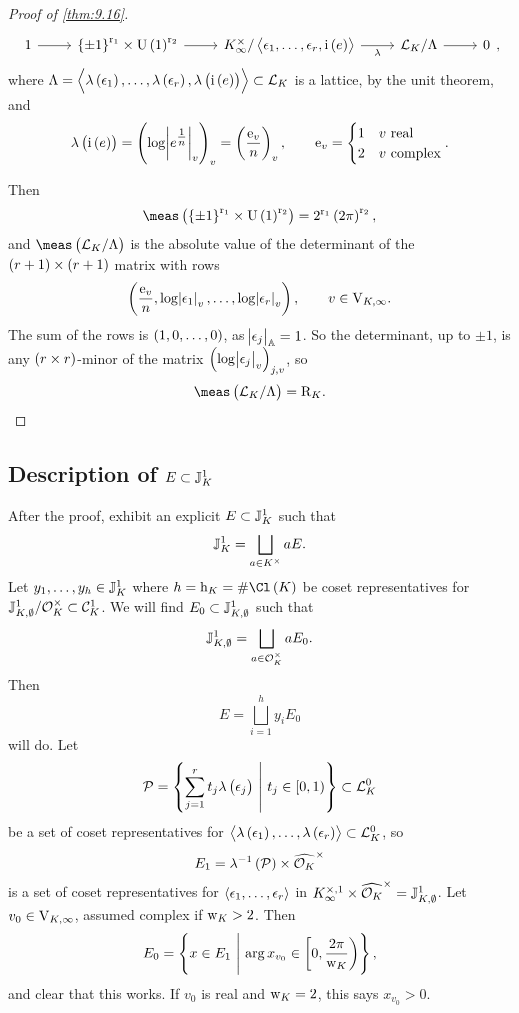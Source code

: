 \begin{proof}[Proof of \ref{thm:9.16}]
$$\begin{tikzcd}
1 \arrow{r} & \cbr{\pm 1}^{\r_1} \times \U\br{1}^{\r_2} \arrow{r} & K_\infty^\times / \abr{\epsilon_1, \dots, \epsilon_r, \i\br{e}} \arrow{r}[swap]{\lambda} & \LLL_K / \Lambda \arrow{r} & 0
\end{tikzcd},
$$
where $ \Lambda = \abr{\lambda\br{\epsilon_1}, \dots, \lambda\br{\epsilon_r}, \lambda\br{\i\br{e}}} \subset \LLL_K $ is a lattice, by the unit theorem, and
$$ \lambda\br{\i\br{e}} = \br{\log \abs{e^{\tfrac{1}{n}}}_v}_v = \br{\dfrac{\e_v}{n}}_v, \qquad \e_v =
\begin{cases}
1 & v \ \text{real} \\
2 & v \ \text{complex}
\end{cases}.
$$

\pagebreak

Then
$$ \meas\br{\cbr{\pm 1}^{\r_1} \times \U\br{1}^{\r_2}} = 2^{\r_1}\br{2\pi}^{\r_2}, $$
and $ \meas\br{\LLL_K / \Lambda} $ is the absolute value of the determinant of the $ \br{r + 1} \times \br{r + 1} $ matrix with rows
$$ \br{\dfrac{\e_v}{n}, \log \abs{\epsilon_1}_v, \dots, \log \abs{\epsilon_r}_v}, \qquad v \in \V_{K, \infty}. $$
The sum of the rows is $ \br{1, 0, \dots, 0} $, as $ \abs{\epsilon_j}_{\mathbb{A}} = 1 $. So the determinant, up to $ \pm 1 $, is any $ \br{r \times r} $-minor of the matrix $ \br{\log \abs{\epsilon_j}_v}_{j, v} $, so
$$ \meas\br{\LLL_K / \Lambda} = \R_K. $$
\end{proof}

\subsection{Description of \texorpdfstring{$ E \subset \mathbb{J}_K^1 $}{the fundamental domain}}

After the proof, exhibit an explicit $ E \subset \mathbb{J}_K^1 $ such that
$$ \mathbb{J}_K^1 = \bigsqcup_{a \in K^\times} aE. $$
Let $ y_1, \dots, y_h \in \mathbb{J}_K^1 $ where $ h = \h_K = \#\Cl\br{K} $ be coset representatives for $ \mathbb{J}_{K, \emptyset}^1 / \mathcal{O}_K^\times \subset \mathcal{C}_K^1 $. We will find $ E_0 \subset \mathbb{J}_{K, \emptyset}^1 $ such that
$$ \mathbb{J}_{K, \emptyset}^1 = \bigsqcup_{a \in \mathcal{O}_K^\times} aE_0. $$
Then
$$ E = \bigsqcup_{i = 1}^h y_iE_0 $$
will do. Let
$$ \PPP = \cbr{\sum_{j = 1}^r t_j\lambda\br{\epsilon_j} \st t_j \in \intco{0, 1}} \subset \LLL_K^0 $$
be a set of coset representatives for $ \abr{\lambda\br{\epsilon_1}, \dots, \lambda\br{\epsilon_r}} \subset \LLL_K^0 $, so
$$ E_1 = \lambda^{-1}\br{\PPP} \times \widehat{\OOO_K}^\times $$
is a set of coset representatives for $ \left\langle \epsilon_1, \dots, \epsilon_r \right\rangle $ in $ K_\infty^{\times, 1} \times \widehat{\mathcal{O}_K}^\times = \mathbb{J}_{K, \emptyset}^1 $. Let $ v_0 \in \mathrm{V}_{K, \infty} $, assumed complex if $ \mathrm{w}_K > 2 $. Then
$$ E_0 = \cbr{x \in E_1 \st \arg x_{v_0} \in \intco{0, \dfrac{2\pi}{\w_K}}}, $$
and clear that this works. If $ v_0 $ is real and $ \mathrm{w}_K = 2 $, this says $ x_{v_0} > 0 $.

